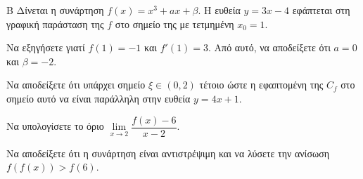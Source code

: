 \begin{thema}{Β}
Δίνεται η συνάρτηση $f(x) = x^3 + a x + \beta$. Η ευθεία $y = 3x - 4$ εφάπτεται στη γραφική παράσταση της $f$ στο σημείο της με τετμημένη $x_0=1$.
\begin{erwthma}
  \item Να εξηγήσετε γιατί $f(1) = -1$ και $f'(1) = 3$. Από αυτό, να αποδείξετε ότι $a=0$ και $\beta=-2$.
  \item Να αποδείξετε ότι υπάρχει σημείο $\xi \in (0, 2)$ τέτοιο ώστε η εφαπτομένη της $C_f$ στο σημείο αυτό να είναι παράλληλη στην ευθεία $y = 4x+1$.
  \item Να υπολογίσετε το όριο $\lim\limits_{x \to 2} \dfrac{f(x)-6}{x-2}$.
  \item Να αποδείξετε ότι η συνάρτηση είναι αντιστρέψιμη και να λύσετε την ανίσωση $f(f(x)) > f(6)$.
\end{erwthma}
\end{thema}
